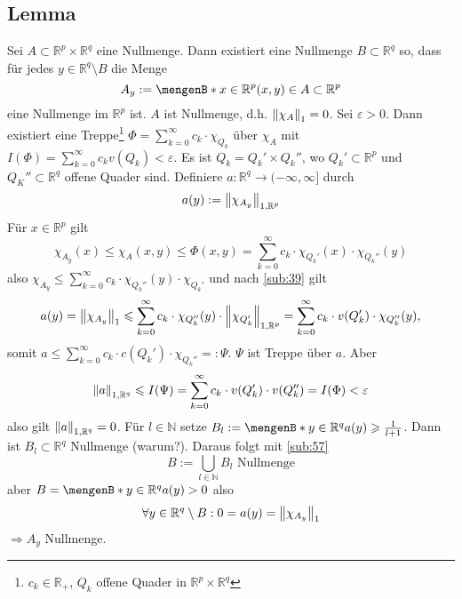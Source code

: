 \subsection[Lemma über Nullmengen]{Lemma} %
\label{sub:71}
Sei $A \subset \mathds{R}^p \times \mathds{R}^q$ eine Nullmenge. Dann existiert eine Nullmenge $B \subset \mathds{R}^q$ so, dass für jedes $y \in \mathds{R}^q\setminus B$
die Menge 
\[
	A_y := \set[x \in \mathds{R}^p]{(x,y) \in A} \subset \mathds{R}^p
\]
eine Nullmenge im $\mathds{R}^p$ ist.
$A$ ist Nullmenge, d.h. $\norm[1]{\chi_A} =0$. Sei $\varepsilon>0$. Dann existiert eine Treppe\footnote{$c_k \in \mathds{R}_+$, $Q_k$ offene Quader in $\mathds{R}^p \times \mathds{R}^q$}
$\Phi = \sum_{k=0}^{\infty} c_k \cdot \chi_{Q_k}$ über $\chi_A$ mit $I(\Phi ) = \sum_{k=0}^{\infty} c_k v(Q_k) < \varepsilon$. Es ist $Q_k = Q_k' \times Q_k''$, wo 
$Q_k' \subset \mathds{R}^p$ und $Q_K'' \subset \mathds{R}^q$ offene Quader sind. Definiere
$a : \mathds{R}^q \to (-\infty, \infty]$ durch 
\[
	a(y) := \norm[1, \mathds{R}^p]{\chi_{A_y}} 
\]
Für $x \in \mathds{R}^p$ gilt 
\[
	\chi_{A_y}(x)  \le \chi_A(x,y) \le \Phi (x,y) = \sum_{k=0}^{\infty} c_k \cdot \chi_{Q_k'}(x) \cdot \chi_{Q_k''}(y) 
\]
also $\chi_{A_y} \le \sum_{k=0}^{\infty} c_k \cdot \chi_{Q_k''}(y) \cdot \chi_{Q_k'}$ und nach \ref{sub:39} gilt
\[
	a(y) = \norm[1]{\chi_{A_y}} \le \sum_{k=0}^{\infty} c_k \cdot \chi_{Q_k''}(y) \cdot \norm[1,\mathds{R}^p]{\chi_{Q_k'}}   = \sum_{k=0}^{\infty} c_k \cdot v(Q_k') \cdot 
	\chi_{Q_k''}(y),
\]
somit $a \le \sum_{k=0}^{\infty} c_k \cdot c(Q_k') \cdot \chi_{Q_k''} =: \Psi$. $\Psi$ ist Treppe über $a$. Aber 
\[
	\norm[1,\mathds{R}^q]{a} \le I(\Psi) = \sum_{k=0}^{\infty} c_k \cdot v(Q_k') \cdot v(Q_k'') = I(\Phi) <\varepsilon 
\]
also gilt $\norm[1,\mathds{R}^q]{a}=0 $. Für $l \in \mathds{N}$ setze $B_l := \set[y \in \mathds{R}^q]{a(y) \ge \frac{1}{l+1} } $. Dann ist $B_l \subset \mathds{R}^q$
Nullmenge (warum?). Daraus folgt mit \ref{sub:57}
\[
	B := \bigcup_{l \in \mathds{N}} B_l \text{ Nullmenge}
\]
aber $B= \set[y \in \mathds{R}^q]{a(y)>0}$ also  
\[
	\forall y \in \mathds{R}^q \setminus B : 0 = a(y) = \norm[1]{\chi_{A_y}} 
\]
$\Rightarrow A_y$ Nullmenge. \bewende

